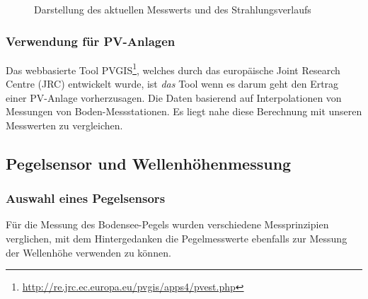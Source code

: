 \begin{figure}[h]
	\centering
	\caption{Darstellung des aktuellen Messwerts und des Strahlungsverlaufs}
	\label{img:radiation}
\end{figure}



\subsubsection{Verwendung für PV-Anlagen}
Das webbasierte Tool PVGIS\footnote{\url{http://re.jrc.ec.europa.eu/pvgis/apps4/pvest.php}}, welches durch das europäische Joint Research Centre (JRC) entwickelt wurde, ist \textit{das} Tool wenn es darum geht den Ertrag einer PV-Anlage vorherzusagen. Die Daten basierend auf Interpolationen von Messungen von Boden-Messstationen. Es liegt nahe diese Berechnung mit unseren Messwerten zu vergleichen.






\subsection{Pegelsensor und Wellenhöhenmessung}
\newline
{}\newline


\subsubsection{Auswahl eines Pegelsensors}
Für die Messung des Bodensee-Pegels wurden verschiedene Messprinzipien verglichen, mit dem Hintergedanken die Pegelmesswerte ebenfalls zur Messung der Wellenhöhe verwenden zu können.


